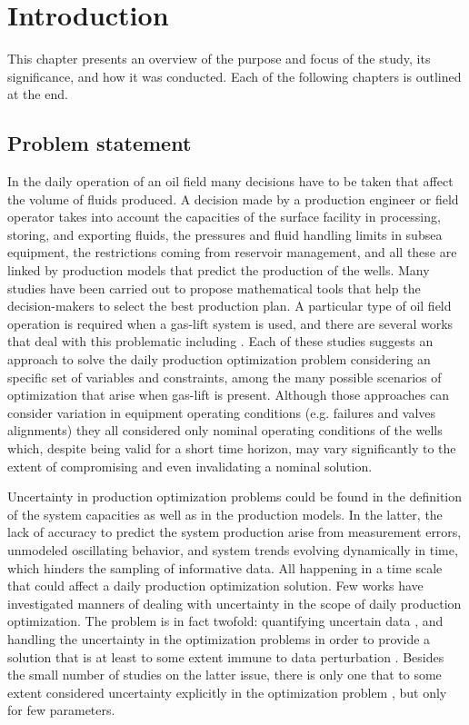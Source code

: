 
\chapter{Introduction}\label{int}
%
This chapter presents an overview of the purpose and focus of the study, its significance, and how it was conducted. Each of the following chapters is outlined at the end.
%
\section{Problem statement}
%
In the daily operation of an oil field many decisions have to be taken that affect the volume of fluids produced. A decision made by a production engineer or field operator takes into account the capacities of the surface facility in processing, storing, and exporting fluids, the pressures and fluid handling limits in subsea equipment, the restrictions coming from reservoir management, and all these are linked by production models that predict the production of the wells.
%
Many studies have been carried out to propose mathematical tools that help the decision-makers to select the best production plan. 
%
A particular type of oil field operation is required when a gas-lift system is used, and there are several works that deal with this problematic including \cite{Redden1974,Buitrago1996,Kosmidis2004,Campos2010,Gunnerud2010,Codas2012a,Silva2014,Lima2015}. 
%
Each of these studies suggests an approach to solve the daily production optimization problem considering an specific set of variables and constraints, among the many possible scenarios of optimization that arise when gas-lift is present.
%
Although those approaches can consider variation in equipment operating conditions (e.g. failures and valves alignments) they all considered only  nominal operating conditions of the wells which, despite being valid for a short time horizon, may vary significantly to the extent of compromising and even invalidating a nominal solution.
%

%
Uncertainty in production optimization problems could be found in the definition of the system capacities as well as in the production models. In the latter, the lack of accuracy to predict the system production arise from measurement errors, unmodeled oscillating behavior, and system trends evolving dynamically in time, which hinders the sampling of informative data. All happening in a time scale that could affect a daily production optimization solution.
%
Few works have investigated manners of dealing with uncertainty in the scope of daily production optimization. The problem is in fact twofold: quantifying uncertain data \cite{Elgsaeter2008}, and handling the uncertainty in the optimization problems in order to provide a solution that is at least to some extent immune to data perturbation \cite{Nakashima2006,Bieker2007b,Elgsaeter2010}.
%
Besides the small number of studies on the latter issue, there is only one that to some extent considered uncertainty explicitly in the optimization problem \cite{Bieker2007b}, but only for few parameters.
%

